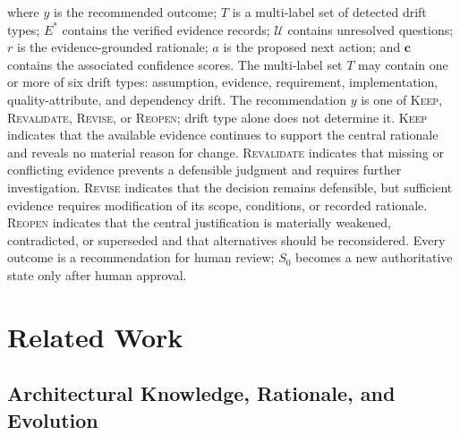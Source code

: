 \documentclass[10pt,conference]{IEEEtran}
\begin{document}
where $y$ is the recommended outcome; $T$ is a multi-label set of detected drift types; $E^{*}$ contains the verified evidence records; $\mathcal{U}$ contains unresolved questions; $r$ is the evidence-grounded rationale; $a$ is the proposed next action; and $\mathbf{c}$ contains the associated confidence scores.  The multi-label set $T$ may contain one or more of six drift types: assumption, evidence, requirement, implementation, quality-attribute, and dependency drift. The recommendation $y$ is one of \textsc{Keep}, \textsc{Revalidate}, \textsc{Revise}, or \textsc{Reopen}; drift type alone does not determine it. \textsc{Keep} indicates that the available evidence continues to support the central rationale and reveals no material reason for change. \textsc{Revalidate} indicates that missing or conflicting evidence prevents a defensible judgment and requires further investigation. \textsc{Revise} indicates that the decision remains defensible, but sufficient evidence requires modification of its scope, conditions, or recorded rationale. \textsc{Reopen} indicates that the central justification is materially weakened, contradicted, or superseded and that alternatives should be reconsidered. Every outcome is a recommendation for human review; $S_0$ becomes a new authoritative state only after human approval.

\section{Related Work}
\label{sec:related-work}

\subsection{Architectural Knowledge, Rationale, and Evolution}
\end{document}
